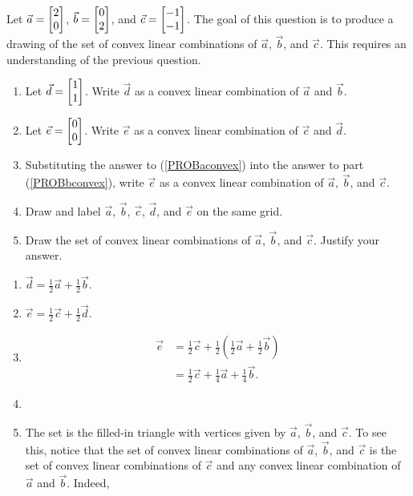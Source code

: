 \begin{exercises}
\begin{problist}
	\prob
		Let $\vec a=\mat{2 \\0}$, $\vec b=\mat{0 \\ 2}$, and $\vec c=\mat{-1 \\ -1}$. 
		The goal of this question is to produce a drawing of the set of 
		convex linear combinations of $\vec a$, $\vec b$, and $\vec c$. This requires an understanding of the previous question.
		\begin{enumerate}
		\item \label{PROBaconvex} Let $\vec d=\mat{1 \\ 1}$. Write $\vec d$ as a convex
			linear combination of $\vec a$ and $\vec b$.
		\item \label{PROBbconvex} Let $\vec e=\mat{0 \\ 0}$. Write $\vec e$ as a convex 
			linear combination of $\vec c$ and $\vec d$.
		\item Substituting the answer to (\ref{PROBaconvex}) into the answer to part
			(\ref{PROBbconvex}), write $\vec e$ as a convex linear combination of $\vec a$, $\vec b$, and $\vec c$.
		\item Draw and label $\vec a$, $\vec b$, $\vec c$, $\vec d$, and
			$\vec e$ on the same grid.
		\item Draw the set of convex linear combinations of $\vec a$, $\vec b$, 
			and $\vec c$. Justify your answer.
		\end{enumerate}
	\begin{solution}
		\begin{enumerate}
			\item
				$
					\vec d = \tfrac{1}{2}\vec a + \tfrac{1}{2}\vec b.
				$
				 \item
				$
					\vec e= \tfrac{1}{2}\vec c+\tfrac{1}{2}\vec d.
				$
				 \item
				\begin{align*}
					\vec e & = \tfrac{1}{2}\vec c+\tfrac{1}{2}(\tfrac{1}{2}\vec a + \tfrac{1}{2}\vec b)\\
					       & = \tfrac{1}{2}\vec c+\tfrac{1}{4}\vec a + \tfrac{1}{4}\vec b.
				\end{align*}
				\item 
				\item The set is the filled-in
				triangle with vertices given by $\vec a$,
				$\vec b$, and $\vec c$. To see this, notice
				that the set of convex linear combinations of
				$\vec a$, $\vec b$, and $\vec c$ is the set of
				convex linear combinations of $\vec c$ and any
				convex linear combination of $\vec a$ and
				$\vec b$. Indeed,

\end{enumerate}
\end{solution}
\end{problist}
\end{exercises}
